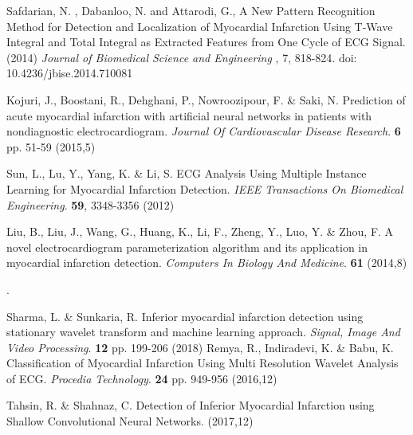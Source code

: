 \documentclass{ieeeaccess}
\begin{document}
\begin{thebibliography}{1}
 Safdarian, N. , Dabanloo, N. and Attarodi, G., A New Pattern Recognition Method for Detection and Localization of Myocardial Infarction Using T-Wave Integral and Total Integral as Extracted Features from One Cycle of ECG Signal.(2014) {\em Journal of Biomedical Science and Engineering} , 7, 818-824. doi: 10.4236/jbise.2014.710081

Kojuri, J., Boostani, R., Dehghani, P., Nowroozipour, F. \& Saki, N. Prediction of acute myocardial infarction with artificial neural networks in patients with nondiagnostic electrocardiogram. {\em Journal Of Cardiovascular Disease Research}. \textbf{6} pp. 51-59 (2015,5)

Sun, L., Lu, Y., Yang, K. \& Li, S. ECG Analysis Using Multiple Instance Learning for Myocardial Infarction Detection. {\em IEEE Transactions On Biomedical Engineering}. \textbf{59}, 3348-3356 (2012)

Liu, B., Liu, J., Wang, G., Huang, K., Li, F., Zheng, Y., Luo, Y. \& Zhou, F. A novel electrocardiogram parameterization algorithm and its application in myocardial infarction detection. {\em Computers In Biology And Medicine}. \textbf{61} (2014,8)













.



Sharma, L. \& Sunkaria, R. Inferior myocardial infarction detection using stationary wavelet transform and machine learning approach. {\em Signal, Image And Video Processing}. \textbf{12} pp. 199-206 (2018)
Remya, R., Indiradevi, K. \& Babu, K. Classification of Myocardial Infarction Using Multi Resolution Wavelet Analysis of ECG. {\em Procedia Technology}. \textbf{24} pp. 949-956 (2016,12)

Tahsin, R. \& Shahnaz, C. Detection of Inferior Myocardial Infarction using Shallow Convolutional Neural Networks.  (2017,12)


\end{thebibliography}
\end{document}
